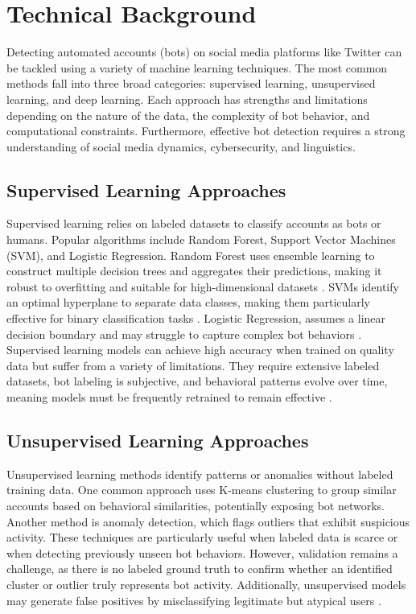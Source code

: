 \documentclass[10pt,twocolumn]{article}
\begin{document}
\section{Technical Background}
Detecting automated accounts (bots) on social media platforms like Twitter can be tackled using a variety of machine learning techniques. The most common methods fall into three broad categories: supervised learning, unsupervised learning, and deep learning. Each approach has strengths and limitations depending on the nature of the data, the complexity of bot behavior, and computational constraints. Furthermore, effective bot detection requires a strong understanding of social media dynamics, cybersecurity, and linguistics.

\subsection{Supervised Learning Approaches}
Supervised learning relies on labeled datasets to classify accounts as bots or humans. Popular algorithms include Random Forest, Support Vector Machines (SVM), and Logistic Regression. Random Forest uses ensemble learning to construct multiple decision trees and aggregates their predictions, making it robust to overfitting and suitable for high-dimensional datasets \cite{Grimme2018}. SVMs identify an optimal hyperplane to separate data classes, making them particularly effective for binary classification tasks \cite{Hayawi2023}. Logistic Regression, assumes a linear decision boundary and may struggle to capture complex bot behaviors \cite{Cai2017}. Supervised learning models can achieve high accuracy when trained on quality data but suffer from a variety of limitations. They require extensive labeled datasets, bot labeling is subjective, and behavioral patterns evolve over time, meaning models must be frequently retrained to remain effective \cite{Orabi2020}.

\subsection{Unsupervised Learning Approaches}
Unsupervised learning methods identify patterns or anomalies without labeled training data. One common approach uses K-means clustering to group similar accounts based on behavioral similarities, potentially exposing bot networks. Another method is anomaly detection, which flags outliers that exhibit suspicious activity. These techniques are particularly useful when labeled data is scarce or when detecting previously unseen bot behaviors. However, validation remains a challenge, as there is no labeled ground truth to confirm whether an identified cluster or outlier truly represents bot activity. Additionally, unsupervised models may generate false positives by misclassifying legitimate but atypical users \cite{Yang2023}.
\end{document}
